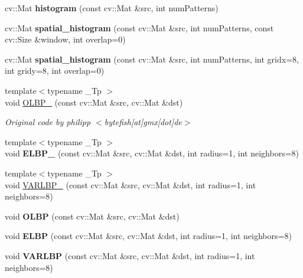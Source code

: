 \begin{DoxyCompactItemize}
\item 
cv\+::\+Mat {\bfseries histogram} (const cv\+::\+Mat \&src, int num\+Patterns)\label{namespacelbp_ab84f853b680a693ba42f63e32cdbb7b6}

\item 
cv\+::\+Mat {\bfseries spatial\+\_\+histogram} (const cv\+::\+Mat \&src, int num\+Patterns, const cv\+::\+Size \&window, int overlap=0)\label{namespacelbp_a969e1b4575a7bdaf68271e5855b2a3da}

\item 
cv\+::\+Mat {\bfseries spatial\+\_\+histogram} (const cv\+::\+Mat \&src, int num\+Patterns, int gridx=8, int gridy=8, int overlap=0)\label{namespacelbp_abc898ced323b22d8659c5a8a28a805b7}

\item 
{\footnotesize template$<$typename \+\_\+\+Tp $>$ }\\void \hyperlink{namespacelbp_a640337219aa7c2a5326fa41af8269cc5}{O\+L\+B\+P\+\_\+} (const cv\+::\+Mat \&src, cv\+::\+Mat \&dst)
\begin{DoxyCompactList}\small\item\em Original code by philipp $<$bytefish\mbox{[}at\mbox{]}gmx\mbox{[}dot\mbox{]}de$>$ \end{DoxyCompactList}\item 
{\footnotesize template$<$typename \+\_\+\+Tp $>$ }\\void {\bfseries E\+L\+B\+P\+\_\+} (const cv\+::\+Mat \&src, cv\+::\+Mat \&dst, int radius=1, int neighbors=8)\label{namespacelbp_a0a37f5c75a252b844f2a0a53e39d4d1c}

\item 
{\footnotesize template$<$typename \+\_\+\+Tp $>$ }\\void \hyperlink{namespacelbp_a32baee0ff6f7c9703bc16f1e965e7324}{V\+A\+R\+L\+B\+P\+\_\+} (const cv\+::\+Mat \&src, cv\+::\+Mat \&dst, int radius=1, int neighbors=8)
\item 
void {\bfseries O\+L\+BP} (const cv\+::\+Mat \&src, cv\+::\+Mat \&dst)\label{namespacelbp_aa36d3518cf5dfc2287a833598ecd2247}

\item 
void {\bfseries E\+L\+BP} (const cv\+::\+Mat \&src, cv\+::\+Mat \&dst, int radius=1, int neighbors=8)\label{namespacelbp_a7ca5bceb1a229bac0760c527a68e838e}

\item 
void {\bfseries V\+A\+R\+L\+BP} (const cv\+::\+Mat \&src, cv\+::\+Mat \&dst, int radius=1, int neighbors=8)\label{namespacelbp_a0b3e413fbb2c14f3d7e5c99370a6671d}


\end{DoxyCompactItemize}
